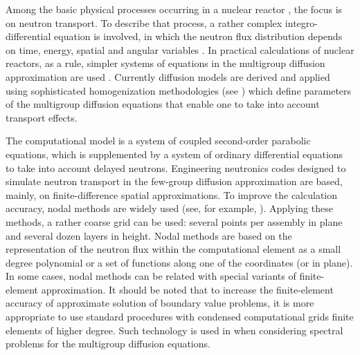 \documentclass[authoryear]{elsarticle}
\begin{document}
Among the basic physical processes occurring in a nuclear reactor  \citep{duderstadt1976nuclear}, 
the focus is on neutron transport. To describe that process, a rather complex integro-differential equation is involved, in which the neutron flux distribution depends on time, energy, spatial and angular variables  \citep{hetrick1971dynamics,stacey}. 
In practical calculations of nuclear reactors, as a rule,  simpler systems of equations in the multigroup diffusion  approximation  are used  \citep{marchuk1986numerical,lewis1993computational,sutton1996diffusion,cho2005fundamentals}.
Currently diffusion models are derived and applied using sophisticated homogenization methodologies (see \cite{sanchez2009assembly,dugan2016cross}) 
which define parameters of the multigroup diffusion equations that enable one to take into account transport effects. 

The computational model is a system of coupled second-order parabolic equations, which is supplemented by a system of ordinary differential equations to take into account delayed neutrons. Engineering neutronics codes designed to simulate neutron transport in the few-group diffusion approximation are based, mainly, on finite-difference spatial approximations. To improve the calculation accuracy, nodal methods are widely used (see, for example, \cite{smith1979analytic,lawrence1986progress}). 
Applying these methods, a rather coarse grid can be used: several points per assembly in plane and several dozen layers in height. Nodal methods are based on the representation of the neutron flux within the computational element as a small degree polynomial or a set of functions along one of the coordinates (or in plane). In some cases, nodal methods can be related  \citep{grossman2007nodal} with special variants of finite-element approximation. It should be noted that to increase the finite-element accuracy of approximate solution of boundary value problems, it is more appropriate to use standard procedures with condensed  computational grids finite elements of higher degree. Such technology is used in  \cite{vidal2014solution,avvakumov2017spectral} 
when considering spectral problems for the multigroup diffusion equations.
\end{document}
